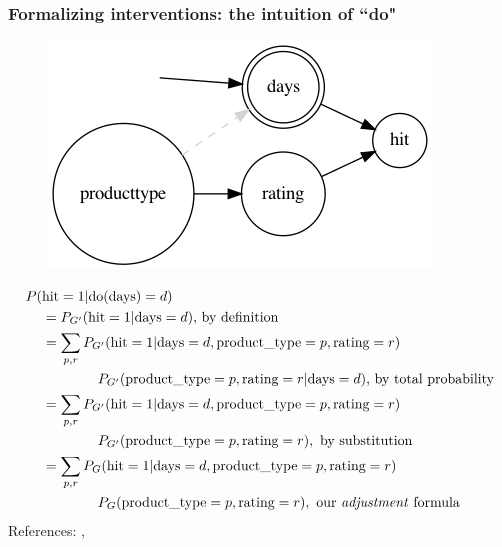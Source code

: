 \begin{frame}
\frametitle{Formalizing interventions: the intuition of ``do"}
	\vspace{-1.5cm}
	\begin{figure}[ht]
	\hspace{8cm}
             \includegraphics[height=0.45\textheight]{graphics/do_days}
        \end{figure}
        \vspace{-2.5cm}
        \begin{align*}
         P(&\textrm{hit}=1 | \mathrm{do}(\textrm{days})=d) \\
         & = P_{G'}(\textrm{hit}=1 | \textrm{days}=d) \textrm{, by definition} \\
        & = \sum_{p, r} P_{G'}(\textrm{hit}=1 | \textrm{days}=d, \textrm{product\_type} = p, \textrm{rating} = r) \\
        & \qquad  \qquad P_{G'}(\textrm{product\_type} = p, \textrm{rating} = r | \textrm{days}=d)\textrm{, by total probability} \\
        & = \sum_{p, r} P_{G'}(\textrm{hit}=1 | \textrm{days}=d, \textrm{product\_type} = p, \textrm{rating} = r) \\
        & \qquad  \qquad P_{G'}(\textrm{product\_type} = p, \textrm{rating} = r), \textrm{ by substitution} \\
        & =  \sum_{p, r} P_{G}(\textrm{hit}=1 | \textrm{days}=d, \textrm{product\_type} = p, \textrm{rating} = r) \\
        & \qquad  \qquad P_{G}(\textrm{product\_type} = p, \textrm{rating} = r), \textrm{ our \emph{adjustment} formula} 
        \end{align*}
        References: \cite{pearl2016causal}, \cite{chmp}
\end{frame}


